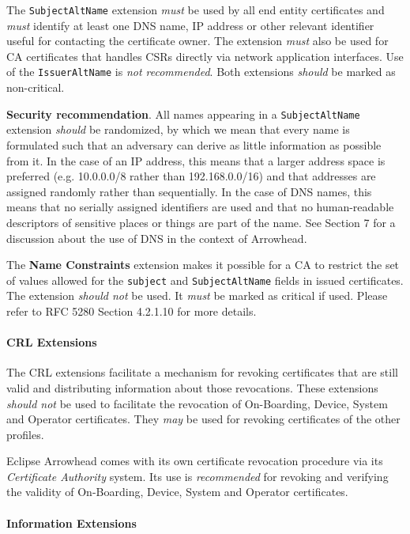 The \texttt{SubjectAltName} extension \textit{must} be used by all end entity certificates and \textit{must} identify at least one DNS name, IP address or other relevant identifier useful for contacting the certificate owner.
The extension \textit{must} also be used for CA certificates that handles CSRs directly via network application interfaces.
Use of the \texttt{IssuerAltName} is \textit{not recommended}.
Both extensions \textit{should} be marked as non-critical.

\textbf{Security recommendation}.
All names appearing in a \texttt{SubjectAltName} extension \textit{should} be randomized, by which we mean that every name is formulated such that an adversary can derive as little information as possible from it.
In the case of an IP address, this means that a larger address space is preferred (e.g. 10.0.0.0/8 rather than 192.168.0.0/16) and that addresses are assigned randomly rather than sequentially.
In the case of DNS names, this means that no serially assigned identifiers are used and that no human-readable descriptors of sensitive places or things are part of the name.
See Section 7 for a discussion about the use of DNS in the context of Arrowhead.

The \textbf{Name Constraints} extension makes it possible for a CA to restrict the set of values allowed for the \texttt{subject} and \texttt{SubjectAltName} fields in issued certificates.
The extension \textit{should not} be used.
It \textit{must} be marked as critical if used.
Please refer to RFC 5280 Section 4.2.1.10 for more details.

\paragraph{CRL Extensions}

The CRL extensions facilitate a mechanism for revoking certificates that are still valid and distributing information about those revocations.
These extensions \textit{should not} be used to facilitate the revocation of On-Boarding, Device, System and Operator certificates.
They \textit{may} be used for revoking certificates of the other profiles.

Eclipse Arrowhead comes with its own certificate revocation procedure via its \textit{Certificate Authority} system.
Its use is \textit{recommended} for revoking and verifying the validity of On-Boarding, Device, System and Operator certificates.

\paragraph{Information Extensions}

